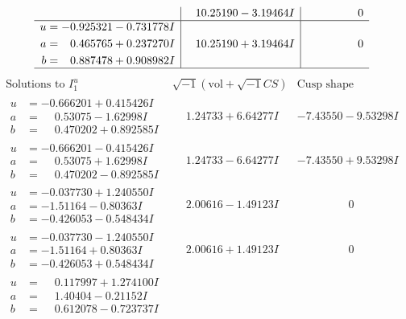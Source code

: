 \documentclass[1p]{elsarticle_modified}
\theoremstyle{definition}
\newcommand{\I}{\sqrt{-1}}
\begin{document}
$$\begin{array}{c|c|c}
 & \phantom{-}10.25190 - 3.19464 I & \phantom{-0.000000 } 0 \\ \hline\begin{aligned}
u &= -0.925321 - 0.731778 I \\
a &= \phantom{-}0.465765 + 0.237270 I \\
b &= \phantom{-}0.887478 + 0.908982 I\end{aligned}
 & \phantom{-}10.25190 + 3.19464 I & \phantom{-0.000000 } 0\\
 \hline 
 \end{array}$$\newpage$$\begin{array}{c|c|c}  
\text{Solutions to }I^u_{1}& \I (\text{vol} + \sqrt{-1}CS) & \text{Cusp shape}\\
 \hline 
\begin{aligned}
u &= -0.666201 + 0.415426 I \\
a &= \phantom{-}0.53075 - 1.62998 I \\
b &= \phantom{-}0.470202 + 0.892585 I\end{aligned}
 & \phantom{-}1.24733 + 6.64277 I & -7.43550 - 9.53298 I \\ \hline\begin{aligned}
u &= -0.666201 - 0.415426 I \\
a &= \phantom{-}0.53075 + 1.62998 I \\
b &= \phantom{-}0.470202 - 0.892585 I\end{aligned}
 & \phantom{-}1.24733 - 6.64277 I & -7.43550 + 9.53298 I \\ \hline\begin{aligned}
u &= -0.037730 + 1.240550 I \\
a &= -1.51164 - 0.80363 I \\
b &= -0.426053 - 0.548434 I\end{aligned}
 & \phantom{-}2.00616 - 1.49123 I & \phantom{-0.000000 } 0 \\ \hline\begin{aligned}
u &= -0.037730 - 1.240550 I \\
a &= -1.51164 + 0.80363 I \\
b &= -0.426053 + 0.548434 I\end{aligned}
 & \phantom{-}2.00616 + 1.49123 I & \phantom{-0.000000 } 0 \\ \hline\begin{aligned}
u &= \phantom{-}0.117997 + 1.274100 I \\
a &= \phantom{-}1.40404 - 0.21152 I \\
b &= \phantom{-}0.612078 - 0.723737 I\end{aligned}

\end{array}$$
\end{document}
